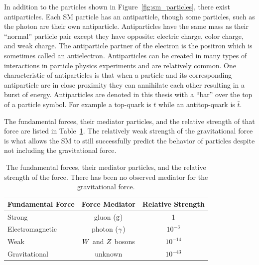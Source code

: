 In addition to the particles shown in Figure~\ref{fig:sm_particles}, there exist antiparticles.
Each SM particle has an antiparticle, though some particles, such as the photon
are their own antiparticle. Antiparticles have the same mass as their
``normal'' particle pair except they have opposite: electric charge, color charge, and weak charge. The antiparticle
partner of the electron is the positron which is sometimes called an antielectron.
Antiparticles can be created in many types of interactions in particle physics experiments
and are relatively common. One characteristic of antiparticles is that when a particle and its 
corresponding antiparticle are in close proximity they can annihilate each other resulting in
a burst of energy.
Antiparticles are denoted in this thesis with a ``bar'' over the top of a particle symbol. For example
a top-quark is $t$ while an antitop-quark is $\bar{t}$.

The fundamental forces, their mediator particles, and the relative strength of that force
are listed in Table~\ref{tab:sm_forces}. The relatively weak strength of the gravitational
force is what allows the SM to still successfully predict the behavior
of particles despite not including the gravitational force.

\begin{table}[htbp]
\centering
\begin{tabular}{lcc}
Fundamental Force        &    Force Mediator             & Relative Strength   \\
\hline
Strong                   &    gluon ($\text{g}$)              &   1                 \\ 
Electromagnetic          &    photon ($\gamma$)            &   $10^{-3}$         \\ 
Weak                     &    $W$ and $Z$ bosons     &   $10^{-14}$        \\ 
Gravitational            &    unknown                    &   $10^{-43}$        \\ 
\hline
\end{tabular}
\caption{
The fundamental forces, their mediator particles, and the relative strength of the force.
There has been no observed mediator for the gravitational force.
}
\label{tab:sm_forces}
\end{table}

